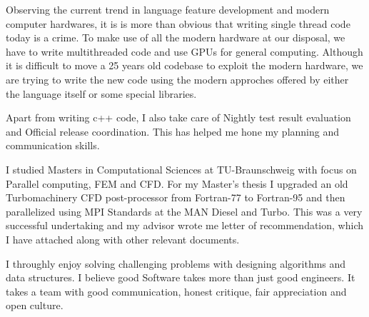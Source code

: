 \documentclass[11pt, a4paper]{awesome-cv}
\begin{document}
\begin{cvletter}
Observing the current trend in language feature development and modern computer 
hardwares, it is is more than obvious that writing single thread code today is 
a crime. To make use of all the modern hardware at our disposal, we have to 
write multithreaded code and use GPUs for general computing. Although it is 
difficult to move a 25 years old codebase to exploit the modern hardware, we 
are trying to write the new code using the modern approches offered by either 
the language itself or some special libraries. 
 
Apart from writing c++ code, I also take care of Nightly test result evaluation
and Official release coordination. This has helped me hone my planning and 
communication skills.

I studied Masters in Computational Sciences at TU-Braunschweig with focus on 
Parallel computing, FEM and CFD. For my Master's thesis I upgraded an old 
Turbomachinery CFD post-processor from Fortran-77 to Fortran-95 and then 
parallelized using MPI Standards at the MAN Diesel and Turbo. This was a very 
successful undertaking and my advisor wrote me letter of recommendation, which
I have attached along with other relevant documents. 




I throughly enjoy solving challenging problems with designing algorithms and 
data structures. 
I believe good Software takes more than just good engineers. It takes a team with good communication,
 honest critique, fair appreciation and open culture.


\end{cvletter}


\makeletterclosing
\end{document}
